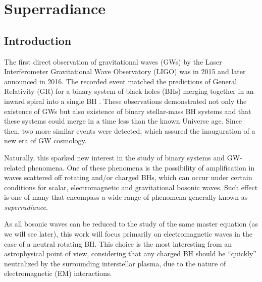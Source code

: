 
\chapter{Superradiance} %
\label{Chapter1}


\section{Introduction}

The first direct observation of gravitational waves (GWs) by the Laser Interferometer Gravitational Wave Observatory (LIGO) was in 2015 and later announced in 2016.
The recorded event matched the predictions of General Relativity (GR) for a binary system of black holes (BHs) merging together in an inward spiral into a single BH \cite{Abbott2016}.
These observations demonstrated not only the existence of GWs but also existence of binary stellar-mass BH systems and that these systems could merge in a time less than the known Universe age.
Since then, two more similar events were detected, which assured the inauguration of a new era of GW cosmology. 

Naturally, this sparked new interest in the study of binary systems and GW-related phenomena.
One of these phenomena is the possibility of amplification in waves scattered off rotating and/or charged BHs, which can occur under certain conditions for scalar, electromagnetic and gravitational bosonic waves.
Such effect is one of many that encompass a wide range of phenomena generally known as \emph{superradiance}.

As all bosonic waves can be reduced to the study of the same master equation (as we will see later), this work will focus primarily on electromagnetic waves in the case of a neutral rotating BH.
This choice is the most interesting from an astrophysical point of view, considering that any charged BH should be ``quickly'' neutralized by the surrounding interstellar plasma, due to the nature of electromagnetic (EM) interactions.

